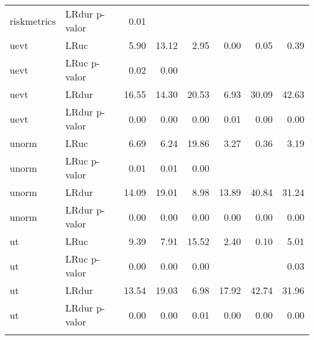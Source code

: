 \begin{longtable}{llrrrrrr}
  riskmetrics & LRdur p-valor & 0.01 &  &  &  &  &  \\ 
  uevt & LRuc & 5.90 & 13.12 & 2.95 & 0.00 & 0.05 & 0.39 \\ 
  uevt & LRuc p-valor & 0.02 & 0.00 &  &  &  &  \\ 
  uevt & LRdur & 16.55 & 14.30 & 20.53 & 6.93 & 30.09 & 42.63 \\ 
  uevt & LRdur p-valor & 0.00 & 0.00 & 0.00 & 0.01 & 0.00 & 0.00 \\ 
  unorm & LRuc & 6.69 & 6.24 & 19.86 & 3.27 & 0.36 & 3.19 \\ 
  unorm & LRuc p-valor & 0.01 & 0.01 & 0.00 &  &  &  \\ 
  unorm & LRdur & 14.09 & 19.01 & 8.98 & 13.89 & 40.84 & 31.24 \\ 
  unorm & LRdur p-valor & 0.00 & 0.00 & 0.00 & 0.00 & 0.00 & 0.00 \\ 
  ut & LRuc & 9.39 & 7.91 & 15.52 & 2.40 & 0.10 & 5.01 \\ 
  ut & LRuc p-valor & 0.00 & 0.00 & 0.00 &  &  & 0.03 \\ 
  ut & LRdur & 13.54 & 19.03 & 6.98 & 17.92 & 42.74 & 31.96 \\ 
  ut & LRdur p-valor & 0.00 & 0.00 & 0.01 & 0.00 & 0.00 & 0.00 \\ 
   \bottomrule
\label{tab:vartest}
\end{longtable}
